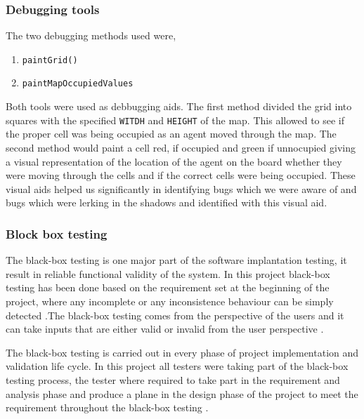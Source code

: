 \subsubsection{Debugging tools}
\indent The two debugging methods used were,  

\begin{enumerate}[itemsep=1pt]
\item \texttt{paintGrid()}
\item \texttt{paintMapOccupiedValues}
\end{enumerate}

Both tools were used as debbugging aids. The first method divided the grid into squares with the specified \texttt{WITDH} and \texttt{HEIGHT} of the map. This allowed to see if the proper cell was being occupied as an agent moved through the map. The second method would paint a cell red, if occupied and green if unnocupied giving a visual representation of the location of the agent on the board whether they were moving through the cells and if the correct cells were being occupied. These visual aids helped us significantly in identifying bugs which we were aware of and bugs which were lerking in the shadows and identified with this visual aid. 


\subsubsection{Block box testing}
 The black-box testing is one major part of the software implantation testing, it result in reliable functional validity of the system. In this project black-box testing has been done based on the requirement set at the beginning of the project, where any incomplete or any inconsistence behaviour can be simply detected .The black-box testing comes from the perspective of the users and it can take inputs that are either valid or invalid from the user perspective \cite{boris}. \newline
 
The black-box testing is carried out in every phase of project implementation and validation life cycle. In this project all testers were taking part of the black-box testing process, the tester where required to take part in the requirement and analysis phase and produce a plane in the design phase of the project  to meet the requirement throughout the black-box testing \cite{boris}. \newline
 
